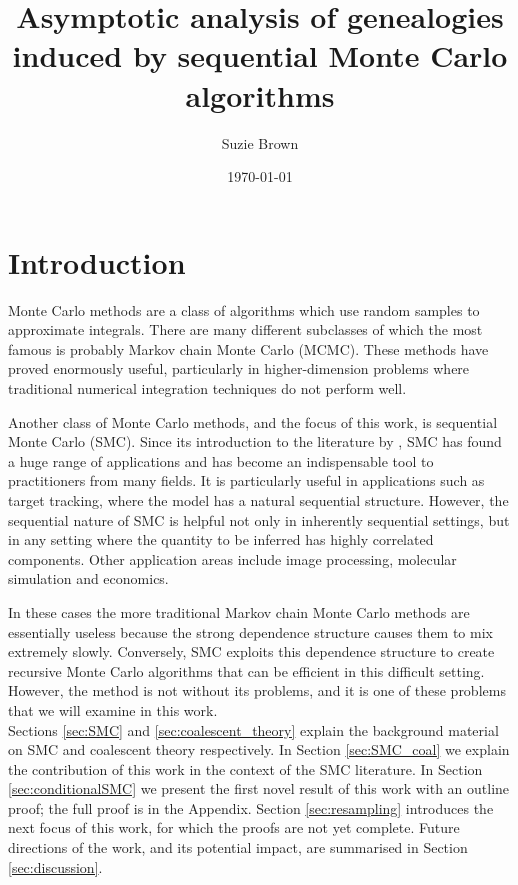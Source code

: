 \documentclass[fleqn]{article}
\title{Asymptotic analysis of genealogies induced by sequential Monte Carlo algorithms}
\author{Suzie Brown}
\date{\today}
\theoremstyle{definition}
\begin{document}
\maketitle
\thispagestyle{fancy}

\section{Introduction}
Monte Carlo methods are a class of algorithms which use random samples to approximate integrals. 
There are many different subclasses of which the most famous is probably Markov chain Monte Carlo (MCMC). 
These methods have proved enormously useful, particularly in higher-dimension problems where traditional numerical integration techniques do not perform well.

Another class of Monte Carlo methods, and the focus of this work, is sequential Monte Carlo (SMC). Since its introduction to the literature by \citet{gordon1993}, SMC has found a huge range of applications and has become an indispensable tool to practitioners from many fields. 
It is particularly useful in applications such as target tracking, where the model has a natural sequential structure.
However, the sequential nature of SMC is helpful not only in inherently sequential settings, but in any setting where the quantity to be inferred has highly correlated components.
Other application areas include image processing, molecular simulation and economics.

In these cases the more traditional Markov chain Monte Carlo methods are essentially useless because the strong dependence structure causes them to mix extremely slowly.
Conversely, SMC exploits this dependence structure to create recursive Monte Carlo algorithms that can be efficient in this difficult setting.
However, the method is not without its problems, and it is one of these problems that we will examine in this work.\\

Sections \ref{sec:SMC} and \ref{sec:coalescent_theory} explain the background material on SMC and coalescent theory respectively. In Section \ref{sec:SMC_coal} we explain the contribution of this work in the context of the SMC literature.
In Section \ref{sec:conditionalSMC} we present the first novel result of this work with an outline proof; the full proof is in the Appendix.
Section \ref{sec:resampling} introduces the next focus of this work, for which the proofs are not yet complete.
Future directions of the work, and its potential impact, are summarised in Section \ref{sec:discussion}.\\
\end{document}
